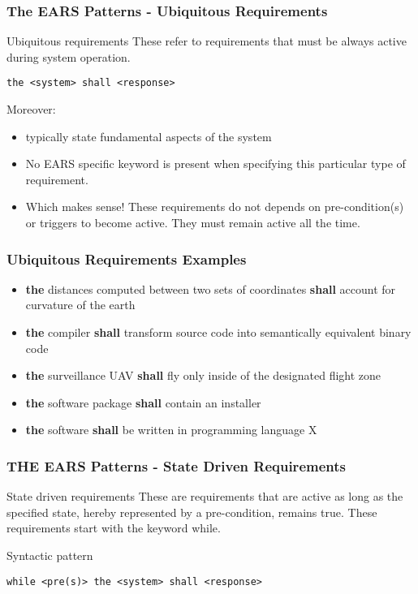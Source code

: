 \documentclass[aspectratio=169]{beamer}
\newcommand{\earsu}[2]{{\bf \color{mypurple}the} {#1} {\bf \color{mypurple}shall} {#2}}
\begin{document}
%
\begin{frame}[fragile]
  \frametitle{The EARS Patterns - Ubiquitous Requirements}
  \begin{block}{Ubiquitous requirements}
    These refer to requirements that must be always active during system operation. 
    \begin{lstlisting}[language=EARS]
                    the <system> shall <response>
    \end{lstlisting}
    Moreover:
    \begin{itemize}
    \item typically state fundamental aspects of the system
    \item No EARS specific keyword is present when specifying this particular type of requirement.
    \item Which makes sense! These requirements do not depends on pre-condition(s) or triggers to become active. They must remain active all the time.
    \end{itemize}
  \end{block}
\end{frame}
%
\begin{frame}[fragile]
  \frametitle{Ubiquitous Requirements Examples}
  \begin{example}
  \begin{itemize}
    \item \earsu{distances computed between two sets of coordinates}{account for curvature of the earth}    
    \item \earsu{compiler}{transform source code into semantically equivalent binary code}
    \item \earsu{surveillance UAV}{fly only inside of the designated flight zone}
    \item \earsu{software package}{contain an installer}
    \item \earsu{software}{be written in programming language X}
  \end{itemize}
  \end{example}
\end{frame}
%
%
\begin{frame}[fragile]
 \frametitle{THE EARS Patterns - State Driven Requirements}
 \begin{block}{State driven requirements}
  These are requirements that are active as long as the specified state, hereby represented by a pre-condition, remains true. These requirements start with the keyword while.
  \end{block}
  \begin{block}{Syntactic pattern}
  \begin{lstlisting}[language=EARS]
              while <pre(s)> the <system> shall <response>
  \end{lstlisting}  
  \end{block}
\end{frame}
\end{document}
